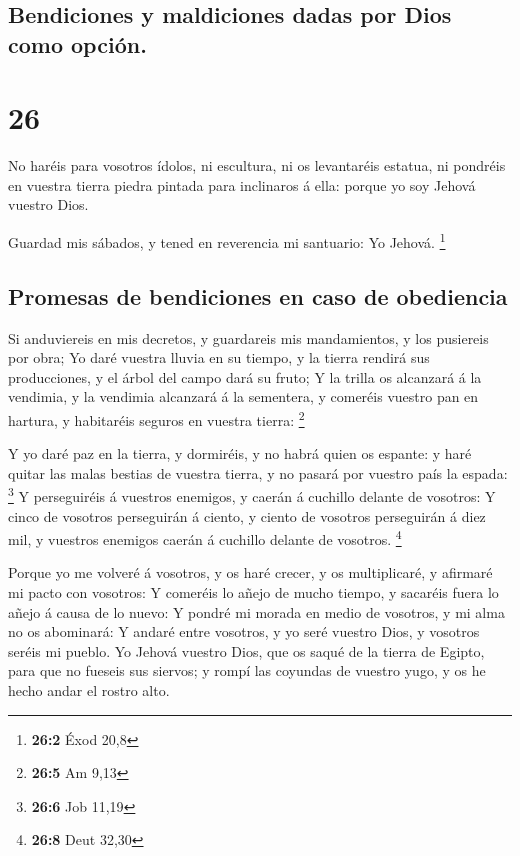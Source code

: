 \hypertarget{bendiciones-y-maldiciones-dadas-por-dios-como-opciuxf3n.}{%
\subsection{Bendiciones y maldiciones dadas por Dios como
opción.}\label{bendiciones-y-maldiciones-dadas-por-dios-como-opciuxf3n.}}

\hypertarget{section-25}{%
\section{26}\label{section-25}}

 No haréis para vosotros ídolos, ni escultura, ni os
levantaréis estatua, ni pondréis en vuestra tierra piedra pintada para
inclinaros á ella: porque yo soy Jehová vuestro Dios.

 Guardad mis sábados, y tened en reverencia mi santuario:
Yo Jehová. \footnote{\textbf{26:2} Éxod 20,8}

\hypertarget{promesas-de-bendiciones-en-caso-de-obediencia}{%
\subsection{Promesas de bendiciones en caso de
obediencia}\label{promesas-de-bendiciones-en-caso-de-obediencia}}

 Si anduviereis en mis decretos, y guardareis mis
mandamientos, y los pusiereis por obra;  Yo daré vuestra
lluvia en su tiempo, y la tierra rendirá sus producciones, y el árbol
del campo dará su fruto;  Y la trilla os alcanzará á la
vendimia, y la vendimia alcanzará á la sementera, y comeréis vuestro pan
en hartura, y habitaréis seguros en vuestra tierra: \footnote{\textbf{26:5}
  Am 9,13}

 Y yo daré paz en la tierra, y dormiréis, y no habrá quien
os espante: y haré quitar las malas bestias de vuestra tierra, y no
pasará por vuestro país la espada: \footnote{\textbf{26:6} Job 11,19}
 Y perseguiréis á vuestros enemigos, y caerán á cuchillo
delante de vosotros:  Y cinco de vosotros perseguirán á
ciento, y ciento de vosotros perseguirán á diez mil, y vuestros enemigos
caerán á cuchillo delante de vosotros. \footnote{\textbf{26:8} Deut
  32,30}

 Porque yo me volveré á vosotros, y os haré crecer, y os
multiplicaré, y afirmaré mi pacto con vosotros:  Y
comeréis lo añejo de mucho tiempo, y sacaréis fuera lo añejo á causa de
lo nuevo:  Y pondré mi morada en medio de vosotros, y mi
alma no os abominará:  Y andaré entre vosotros, y yo seré
vuestro Dios, y vosotros seréis mi pueblo.  Yo Jehová
vuestro Dios, que os saqué de la tierra de Egipto, para que no fueseis
sus siervos; y rompí las coyundas de vuestro yugo, y os he hecho andar
el rostro alto.


